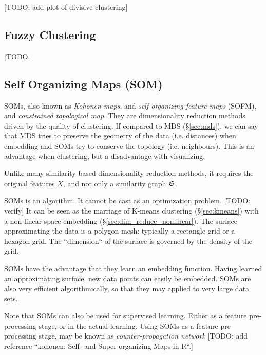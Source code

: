 [TODO: add plot of divisive clustering]




\subsection{Fuzzy Clustering}
\label{sec:fuzzy_clustering}
[TODO]




\subsection{Self Organizing Maps (SOM)}
\label{sec:som}



SOMs, also known as \emph{Kohonen maps}, and \emph{self organizing feature maps} (SOFM), and \emph{constrained topological map}. 
They are dimensionality reduction methods driven by the quality of clustering.
If compared to MDS (\S\ref{sec:mds}), we can say that MDS tries to preserve the geometry of the data (i.e. distances) when embedding and SOMs try to conserve the topology (i.e. neighbours).
This is an advantage when clustering, but a disadvantage with visualizing. 

Unlike many similarity based dimensionality reduction methods, it requires the original features $X$, and not only a similarity graph $\mathfrak{S}$. 

SOMs is an algorithm. It cannot be cast as an optimization problem. [TODO: verify]
It can be seen as the marriage of K-means clustering (\S\ref{sec:kmeans}) with a non-linear space embedding (\S\ref{sec:dim_reduce_nonlinear}). 
The surface approximating the data is a polygon mesh: typically a rectangle grid or a hexagon grid.
The ``dimension`` of the surface is governed by the density of the grid.

SOMs have the advantage that they learn an embedding function. Having learned an approximating surface, new data points can easily be embedded.
SOMs are also very efficient algorithmically, so that they may applied to very large data sets.

Note that SOMs can also be used for supervised learning. Either as a feature pre-processing stage, or in the actual learning.
Using SOMs as a feature pre-processing stage, may be known as \emph{counter-propagation network} [TODO: add reference ``kohonen: Self- and Super-organizing Maps in R``.]



